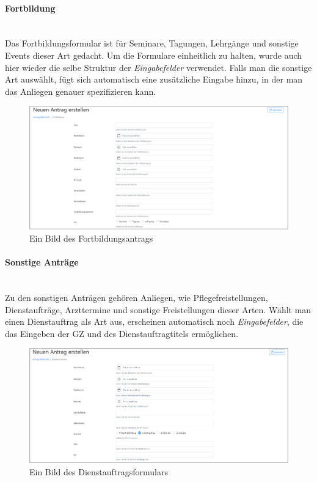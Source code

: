 \paragraph{Fortbildung}
~\\
Das Fortbildungsformular ist für Seminare, Tagungen, Lehrgänge und sonstige Events dieser Art gedacht. Um die Formulare einheitlich zu halten, wurde auch hier wieder die selbe Struktur der \textit{Eingabefelder} verwendet. Falls man die sonstige Art auswählt, fügt sich automatisch eine zusätzliche Eingabe hinzu, in der man das Anliegen genauer spezifizieren kann.
\begin{figure}[H]
	\centering
	\includegraphics[width=1\linewidth]{images/ldehner_implementierung/fortbildung_1}
	\caption[Fortbildungsantrag]{Ein Bild des Fortbildungsantrags}
	\label{fig:frotbildung}
\end{figure}

\paragraph{Sonstige Anträge}
~\\
Zu den sonstigen Anträgen gehören Anliegen, wie Pflegefreistellungen, Dienstaufträge, Arzttermine und sonstige Freistellungen dieser Arten. Wählt man einen Dienstauftrag als Art aus, erscheinen automatisch noch \textit{Eingabefelder}, die das Eingeben der GZ und des Dienstauftragtitels ermöglichen.
\begin{figure}[H]
	\centering
	\includegraphics[width=1\linewidth]{images/ldehner_implementierung/dienstauftrag}
	\caption[Dienstreiseauftrag]{Ein Bild des Dienstauftragsformulars}
	\label{fig:dienst}
\end{figure}

